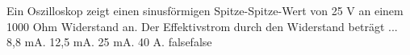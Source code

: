     {Ein Oszilloskop zeigt einen sinusförmigen Spitze-Spitze-Wert von 25 V an einem 1000 Ohm Widerstand an. Der Effektivstrom durch den Widerstand beträgt ...}
    {8,8 mA.}
    {12,5 mA.}
    {25 mA.}
    {40 A.}
    {false}{false}